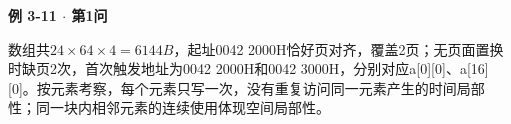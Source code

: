 {\color{ink}\bfseries 例 3-11 \(\cdot \) 第1问}\par\vspace{1bp}数组共\(24\times 64\times 4=\allowbreak{}6144 B\)，起址0042 2000H恰好页对齐，覆盖2页；无页面置换时缺页2次，首次触发地址为0042 2000H和0042 3000H，分别对应a[0][0]、a[16][0]。按元素考察，每个元素只写一次，没有重复访问同一元素产生的时间局部性；同一块内相邻元素的连续使用体现空间局部性。

